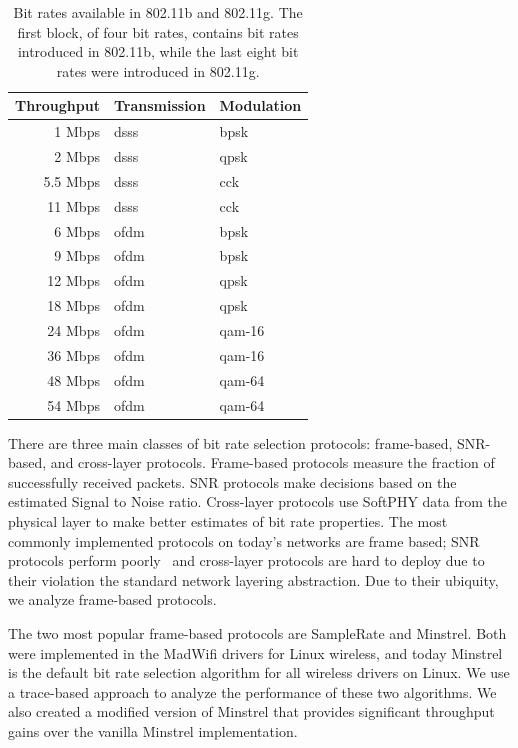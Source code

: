 \documentclass[twocolumn,10pt]{article}
\begin{document}
\begin{table}[bthp]
  \begin{tabular}{r|l|l}
    Throughput & Transmission & Modulation \\\hline

    1   Mbps & dsss & bpsk \\
    2   Mbps & dsss & qpsk \\
    5.5 Mbps & dsss & cck \\
    11  Mbps & dsss & cck \\\hline
    
    6   Mbps & ofdm & bpsk \\
    9   Mbps & ofdm & bpsk \\
    12  Mbps & ofdm & qpsk \\
    18  Mbps & ofdm & qpsk \\
    24  Mbps & ofdm & qam-16 \\
    36  Mbps & ofdm & qam-16 \\
    48  Mbps & ofdm & qam-64 \\
    54  Mbps & ofdm & qam-64 \\
  \end{tabular}
  \caption{Bit rates available in 802.11b and 802.11g.  The first
    block, of four bit rates, contains bit rates introduced in
    802.11b, while the last eight bit rates were introduced in
    802.11g.}
  \label{tbl:bitrates}
\end{table}

There are three main classes of bit rate selection protocols:
frame-based, SNR-based, and cross-layer protocols.  Frame-based
protocols measure the fraction of successfully received packets.  SNR
protocols make decisions based on the estimated Signal to Noise ratio.
Cross-layer protocols use SoftPHY data from the physical layer to make
better estimates of bit rate properties.  The most commonly
implemented protocols on today's networks are frame based; SNR
protocols perform poorly~\cite{samplerate} and cross-layer protocols
are hard to deploy due to their violation the standard network
layering abstraction.  Due to their ubiquity, we analyze frame-based
protocols.

The two most popular frame-based protocols are SampleRate and
Minstrel.  Both were implemented in the MadWifi drivers for Linux
wireless, and today Minstrel is the default bit rate selection
algorithm for all wireless drivers on Linux.  We use a trace-based
approach to analyze the performance of these two algorithms.  We also
created a modified version of Minstrel that provides significant
throughput gains over the vanilla Minstrel implementation.
\end{document}
